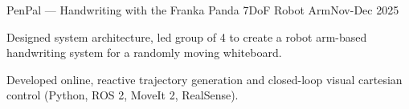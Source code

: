 \documentclass[letterpaper,10pt]{article}
\begin{document}
\begin{jobshort}{PenPal --- Handwriting with the Franka Panda 7DoF Robot Arm}{}{Nov-Dec 2025}
    \item Designed system architecture, led group of 4 to create a robot arm-based handwriting system for a randomly moving whiteboard.
    \item Developed online, reactive trajectory generation and closed-loop visual cartesian control (Python, ROS 2, MoveIt 2, RealSense).
\end{jobshort}

\end{document}
